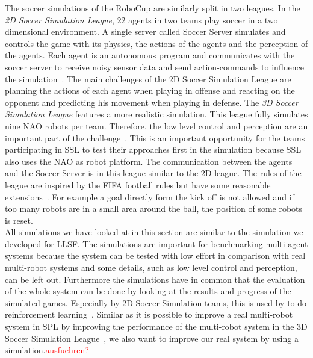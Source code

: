 The soccer simulations of the RoboCup are similarly split in two leagues. In the \textit{2D Soccer Simulation League}, 22 agents in two teams play soccer in a two dimensional environment. A single server called Soccer Server simulates and controls the game with its physics, the actions of the agents and the perception of the agents. Each agent is an autonomous program and communicates with the soccer server to receive noisy sensor data and send action-commands to influence the simulation~\cite{soccer_simulation}. The main challenges of the 2D Soccer Simulation League are planning the actions of each agent when playing in offense and reacting on the opponent and predicting his movement when playing in defense. The \textit{3D Soccer Simulation League} features a more realistic simulation. This league fully simulates nine NAO robots per team. Therefore, the low level control and perception are an important part of the challenge~\cite{soccer_simulation_low_level}. This is an important opportunity for the teams participating in SSL to test their approaches first in the simulation because SSL also uses the NAO as robot platform. The communication between the agents and the Soccer Server is in this league similar to the 2D league. The rules of the league are inspired by the FIFA football rules but have some reasonable extensions~\cite{soccer_rules_3d}. For example a goal directly form the kick off is not allowed and if too many robots are in a small area around the ball, the position of some robots is reset.\\
All simulations we have looked at in this section are similar to the simulation we developed for LLSF. The simulations are important for benchmarking multi-agent systems because the system can be tested with low effort in comparison with real multi-robot systems and some details, such as low level control and perception, can be left out.  Furthermore the simulations have in common that the evaluation of the whole system can be done by looking at the results and progress of the simulated games. Especially by 2D Soccer Simulation teams, this is used by to do reinforcement learning~\cite{simsoccer_reinforcement_1,simsoccer_reinforcement_2}. Similar as it is possible to improve a real multi-robot system in SPL by improving the performance of the multi-robot system in the 3D Soccer Simulation League~\cite{from_sim_to_real}, we also want to improve our real system by using a simulation.\textcolor{red}{ausfuehren?}


